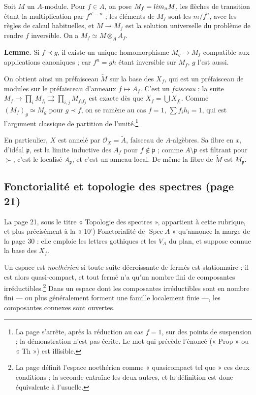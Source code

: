 \documentclass[11pt,a4paper]{article}
\begin{document}
Soit $M$ un $A$-module. Pour $f \in A$, on pose
$M_f = \varinjlim_n M$, les flèches de transition étant la multiplication par
$f^{n'-n}$ ; les éléments de $M_f$ sont les $m/f^n$, avec les règles de calcul
habituelles, et $M \to M_f$ est la solution universelle du problème de rendre
$f$ inversible. On a $M_f \simeq M \otimes_A A_f$.

\textbf{Lemme.} Si $f \prec g$, il existe un unique homomorphisme
$M_g \to M_f$ compatible aux applications canoniques ; car $f^n = gh$ étant
inversible sur $M_f$, $g$ l'est aussi.

On obtient ainsi un préfaisceau $\widetilde{M}$ sur la base des $X_f$, qui est un
préfaisceau de modules sur le préfaisceau d'anneaux $f \mapsto A_f$. C'est un
\emph{faisceau} : la suite
$M_f \to \prod_i M_{f_i} \rightrightarrows \prod_{i,j} M_{f_i f_j}$ est exacte
dès que $X_f = \bigcup X_{f_i}$. Comme $(M_f)_g \simeq M_g$ pour $g \prec f$, on
se ramène au cas $f = 1$, $\sum f_i h_i = 1$, qui est l'argument classique de
partition de l'unité.\footnote{La page s'arrête, après la réduction au cas
$f = 1$, sur des points de suspension ; la démonstration n'est pas écrite. Le mot
qui précède l'énoncé (« Prop » ou « Th ») est illisible.}

En particulier, $X$ est annelé par $\mathcal{O}_X = \widetilde{A}$, faisceau de
$A$-algèbres. Sa fibre en $x$, d'idéal $\mathfrak{p}$, est la limite inductive
des $A_f$ pour $f \notin \mathfrak{p}$ ; comme $A \setminus \mathfrak{p}$ est
filtrant pour $\succ$, c'est le localisé $A_{\mathfrak{p}}$, et c'est un anneau
local. De même la fibre de $\widetilde{M}$ est $M_{\mathfrak{p}}$.

\subsection*{Fonctorialité et topologie des spectres (page 21)}

La page 21, sous le titre « Topologie des spectres », appartient à cette
rubrique, et plus précisément à la « 10') Fonctorialité de $\operatorname{Spec} A$ »
qu'annonce la marge de la page 30 : elle emploie les lettres gothiques et les
$V_A$ du plan, et suppose connue la base des $X_f$.

Un espace est \emph{noethérien} si toute suite décroissante de fermés est
stationnaire ; il est alors quasi-compact, et tout fermé n'a qu'un nombre fini
de composantes irréductibles.\footnote{La page définit l'espace noethérien comme
« quasicompact tel que » ces deux conditions ; la seconde entraîne les deux
autres, et la définition est donc équivalente à l'usuelle.} Dans un espace dont
les composantes irréductibles sont en nombre fini --- ou plus généralement
forment une famille localement finie ---, les composantes connexes sont
ouvertes.
\end{document}
